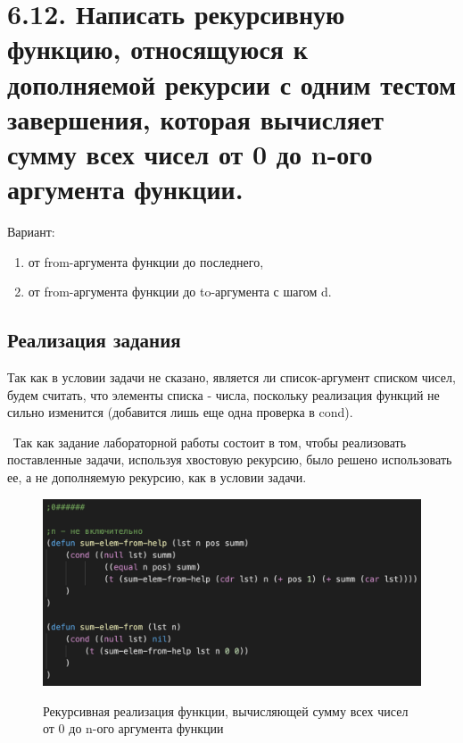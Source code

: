 \documentclass[a4paper,12pt]{article}
\begin{document}
 	\newpage
 	
 	\section*{6.12. Написать рекурсивную функцию, относящуюся к дополняемой рекурсии с
одним тестом завершения, которая вычисляет сумму всех чисел от 0 до n-ого аргумента функции.
 	}
 
 	Вариант:
 	\begin{enumerate}
 	\item от from-аргумента функции до последнего, 
 	\item от from-аргумента функции до to-аргумента с шагом d.
 \end{enumerate}
 	
 	
 	\subsection*{Реализация задания}
 	
 	Так как в условии задачи не сказано, является ли список-аргумент списком чисел, будем считать, что элементы списка - числа, поскольку реализация функций не сильно изменится (добавится лишь еще одна проверка в cond).
 	
 	 Так как задание лабораторной работы состоит в том, чтобы реализовать поставленные задачи, используя хвостовую рекурсию, было решено использовать ее, а не дополняемую рекурсию, как в условии задачи.
 	
 	\begin{figure}[h!]
 		\begin{center}
 			{\includegraphics[scale = 0.8]{6.12.0.png}}
 			\label{ris:6.12.0}
 		\end{center}
 	\caption{Рекурсивная реализация функции, вычисляющей сумму всех чисел от 0 до n-ого аргумента функции}
 	\end{figure}
 
\end{document}
